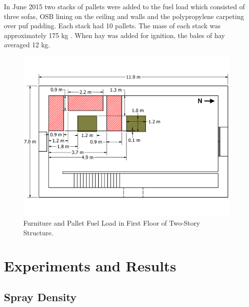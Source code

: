 \documentclass[12pt,oneside]{book}
\begin{document}
In June 2015 two stacks of pallets were added to the fuel load which consisted of three sofas, OSB lining on the ceiling and walls and the polypropylene carpeting over puf padding.  Each stack had 10 pallets.  The mass of each stack was approximately 175 kg .    When hay was added for ignition, the bales of hay averaged 12 kg.


\begin{figure}[!ht]
	\includegraphics[width=\columnwidth]{../../DelCo_2014_2015/Drawings/PDFs/CAFS/West_Structure_1st_Floor_Furniture_Pallets}
	\caption{Furniture and Pallet Fuel Load in First Floor of Two-Story Structure.}
	\label{fig:pallet_furniture_2story}
\end{figure}



\chapter{Experiments and Results}
\label{chap:Experiments_and_Results}

\section{Spray Density}
\label{sec:Spray_Density}
\end{document}
